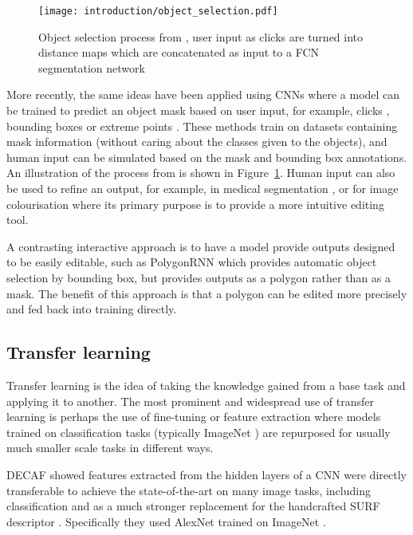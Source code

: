 \begin{figure}[h]
  \centering
  \texttt{[image: introduction/object\_selection.pdf]}
  \caption{Object selection process from \cite{Xu2016b}, user input as clicks are turned into distance maps which are concatenated as input to a \gls{FCN} segmentation network}  
  \label{fig:object_selection}
\end{figure}

More recently, the same ideas have been applied using \gls{CNN}s where a model can be trained to predict an object mask based on user input, for example, clicks \cite{Xu2016b, Boroujerdi2017}, bounding boxes \cite {Xu2017} or extreme points \cite{Maninis2017}. These methods train on datasets containing mask information (without caring about the classes given to the objects), and human input can be simulated based on the mask and bounding box annotations. An illustration of the process from \cite{Xu2016b} is shown in Figure~\ref{fig:object_selection}. Human input can also be used to refine an output, for example, in medical segmentation \cite{Wang2017}, or for image colourisation \cite{Zhang} where its primary purpose is to provide a more intuitive editing tool.

A contrasting interactive approach is to have a model provide outputs designed to be easily editable, such as PolygonRNN \cite{Castrejon2017} which provides automatic object selection by bounding box, but provides outputs as a polygon rather than as a mask. The benefit of this approach is that a polygon can be edited more precisely and fed back into training directly.


\subsection {Transfer learning}

Transfer learning is the idea of taking the knowledge gained from a base task and applying it to another. The most prominent and widespread use of transfer learning is perhaps the use of fine-tuning or feature extraction where models trained on classification tasks (typically ImageNet \cite{JiaDeng2009}) are repurposed for usually much smaller scale tasks in different ways. 

\gls{DECAF} \cite{Donahue2014} showed features extracted from the hidden layers of a \gls{CNN} were directly transferable to achieve the state-of-the-art on many image tasks, including classification and as a much stronger replacement for the handcrafted \gls{SURF} descriptor \cite{bay2006surf}.  Specifically they used AlexNet  \cite{Krizhevsky2012} trained on ImageNet \cite{JiaDeng2009}.

